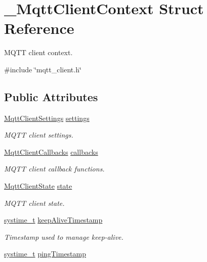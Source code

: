 \hypertarget{struct__MqttClientContext}{}\section{\+\_\+\+Mqtt\+Client\+Context Struct Reference}
\label{struct__MqttClientContext}


M\+Q\+TT client context.  




{\ttfamily \#include \char`\"{}mqtt\+\_\+client.\+h\char`\"{}}

\subsection*{Public Attributes}
\begin{DoxyCompactItemize}
\item 
\hyperlink{structMqttClientSettings}{Mqtt\+Client\+Settings} \hyperlink{struct__MqttClientContext_a7f819b9dd7c2adb6e6507d2689cf50ca}{settings}
\begin{DoxyCompactList}\small\item\em M\+Q\+TT client settings. \end{DoxyCompactList}\item 
\hyperlink{structMqttClientCallbacks}{Mqtt\+Client\+Callbacks} \hyperlink{struct__MqttClientContext_a568a820e1215398e4d12aa8311af8e9e}{callbacks}
\begin{DoxyCompactList}\small\item\em M\+Q\+TT client callback functions. \end{DoxyCompactList}\item 
\hyperlink{mqtt__client_8h_a4962cf68fc8b67cdc2fdd8d5be59ff00}{Mqtt\+Client\+State} \hyperlink{struct__MqttClientContext_ab816e3601da7ee580d958845249d8898}{state}
\begin{DoxyCompactList}\small\item\em M\+Q\+TT client state. \end{DoxyCompactList}\item 
\hyperlink{compiler__port_8h_ae3e32a98d431a02106616da3071832dd}{systime\+\_\+t} \hyperlink{struct__MqttClientContext_aac5179408cb235331a71d1a32bcd09b8}{keep\+Alive\+Timestamp}
\begin{DoxyCompactList}\small\item\em Timestamp used to manage keep-\/alive. \end{DoxyCompactList}\item 
\hyperlink{compiler__port_8h_ae3e32a98d431a02106616da3071832dd}{systime\+\_\+t} \hyperlink{struct__MqttClientContext_a64e70d9946fbf80b98da11bdebb23562}{ping\+Timestamp}

\end{DoxyCompactItemize}
